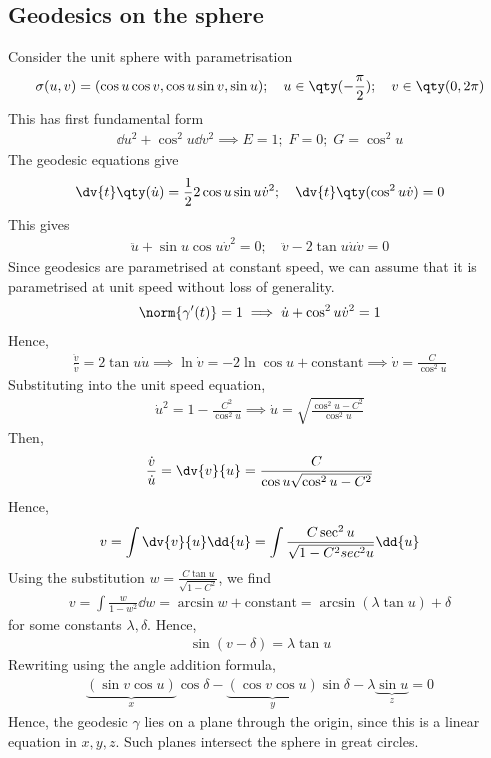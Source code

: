 \subsection{Geodesics on the sphere}
Consider the unit sphere with parametrisation
\begin{align*}
	\sigma(u,v) = (\cos u \cos v, \cos u \sin v, \sin u);\quad u \in \qty(-\frac{\pi}{2});\quad v \in \qty(0, 2 \pi)
\end{align*}
This has first fundamental form
\begin{align*}
	\dd{u}^2 + \cos^2 u \dd{v}^2 \implies E = 1;\; F = 0;\; G = \cos^2 u
\end{align*}
The geodesic equations give
\begin{align*}
	\dv{t} \qty(\dot u) = \frac{1}{2} 2\cos u \sin u \dot v^2;\quad \dv{t} \qty(\cos^2 u \dot v) = 0
\end{align*}
This gives
\begin{align*}
	\ddot u + \sin u \cos u \dot v^2 = 0;\quad \ddot v - 2 \tan u \dot u \dot v = 0
\end{align*}
Since geodesics are parametrised at constant speed, we can assume that it is parametrised at unit speed without loss of generality.
\begin{align*}
	\norm{\gamma'(t)} = 1 \implies \dot u + \cos^2 u \dot v^2 = 1
\end{align*}
Hence,
\begin{align*}
	\frac{\ddot v}{\dot v} = 2 \tan u \dot u \implies \ln \dot v = -2 \ln \cos u + \text{constant} \implies \dot v = \frac{C}{\cos^2 u}
\end{align*}
Substituting into the unit speed equation,
\begin{align*}
	\dot u^2 = 1 - \frac{C^2}{\cos^2 u} \implies \dot u = \sqrt{\frac{\cos^2 u - C^2}{\cos^2 u}}
\end{align*}
Then,
\begin{align*}
	\frac{\dot v}{\dot u} = \dv{v}{u} = \frac{C}{\cos u \sqrt{\cos^2 u - C^2}}
\end{align*}
Hence,
\begin{align*}
	v = \int \dv{v}{u} \dd{u} = \int \frac{C \sec^2 u}{\sqrt{1-C^2 sec^2 u}} \dd{u}
\end{align*}
Using the substitution $w = \frac{C \tan u}{\sqrt{1-C^2}}$, we find
\begin{align*}
	v = \int \frac{w}{1-w^2} \dd{w} = \arcsin w + \text{constant} = \arcsin(\lambda \tan u) + \delta
\end{align*}
for some constants $\lambda, \delta$.
Hence,
\begin{align*}
	\sin (v - \delta) = \lambda \tan u
\end{align*}
Rewriting using the angle addition formula,
\begin{align*}
	\underbrace{(\sin v \cos u)}_{x}\cos \delta - \underbrace{(\cos v \cos u)}_{y}\sin \delta - \lambda \underbrace{\sin u}_z = 0
\end{align*}
Hence, the geodesic $\gamma$ lies on a plane through the origin, since this is a linear equation in $x, y, z$.
Such planes intersect the sphere in great circles.

